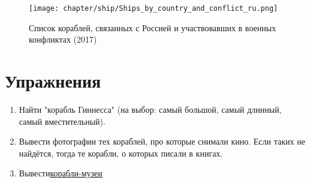 \begin{figure*}
  \texttt{[image: chapter/ship/Ships\_by\_country\_and\_conflict\_ru.png]}
  \caption{Список кораблей, связанных с Россией и участвовавших в военных конфликтах (2017)}%
  \label{fig:ships_by_country_and_conflict}%
\end{figure*}


\newpage
\section{Упражнения}

\begin{enumerate}
  \item Найти "корабль Гиннесса" (на выбор: самый большой, самый длинный, самый вместительный).
  \item Вывести фотографии тех кораблей, про которые снимали кино. Если таких не найдётся, тогда те корабли, о которых писали в книгах.
  \item Вывести\href{https://ru.wikipedia.org/wiki/Список_кораблей-музеев}{корабли-музеи}
\end{enumerate}
